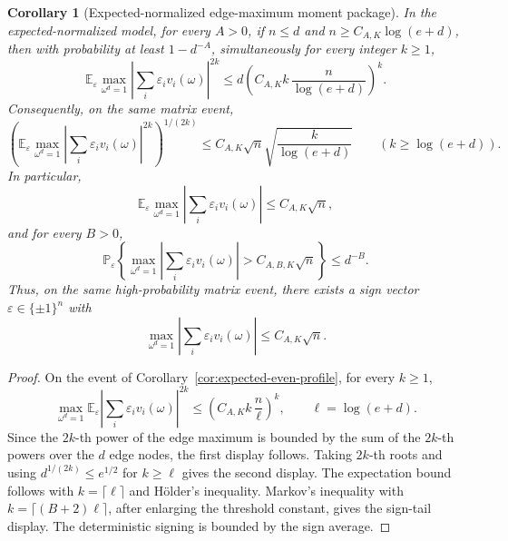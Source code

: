 \documentclass[11pt]{amsart}
\numberwithin{equation}{section}
\newtheorem{corollary}[theorem]{Corollary}
\theoremstyle{definition}
\theoremstyle{remark}
\newcommand{\Prob}{\mathbb P}
\newcommand{\Exp}{\mathbb E}
\newcommand{\eps}{\varepsilon}
\begin{document}
\begin{corollary}[Expected-normalized edge-maximum moment package]
\label{cor:expected-edge-max-moment-package}
In the expected-normalized model, for every \(A>0\), if \(n\le d\) and
\(n\ge C_{A,K}\log(e+d)\), then with probability at least \(1-d^{-A}\),
simultaneously for every integer \(k\ge1\),
\[
  \Exp_\eps
  \max_{\omega^d=1}
  \left|\sum_i\eps_i v_i(\omega)\right|^{2k}
  \le
  d\left(C_{A,K}k\,\frac{n}{\log(e+d)}\right)^k .
\]
Consequently, on the same matrix event,
\[
  \left(
  \Exp_\eps
  \max_{\omega^d=1}
  \left|\sum_i\eps_i v_i(\omega)\right|^{2k}
  \right)^{1/(2k)}
  \le
  C_{A,K}\sqrt n\sqrt{\frac{k}{\log(e+d)}}
  \qquad(k\ge\log(e+d)).
\]
In particular,
\[
  \Exp_\eps
  \max_{\omega^d=1}
  \left|\sum_i\eps_i v_i(\omega)\right|
  \le C_{A,K}\sqrt n,
\]
and for every \(B>0\),
\[
  \Prob_\eps\left\{
  \max_{\omega^d=1}
  \left|\sum_i\eps_i v_i(\omega)\right|
  > C_{A,B,K}\sqrt n
  \right\}
  \le d^{-B}.
\]
Thus, on the same high-probability matrix event, there exists a sign vector
\(\eps\in\{\pm1\}^n\) with
\[
  \max_{\omega^d=1}
  \left|\sum_i\eps_i v_i(\omega)\right|
  \le C_{A,K}\sqrt n .
\]
\end{corollary}

\begin{proof}
On the event of Corollary~\ref{cor:expected-even-profile}, for every \(k\ge1\),
\[
  \max_{\omega^d=1}
  \Exp_\eps\left|\sum_i\eps_i v_i(\omega)\right|^{2k}
  \le
  \left(C_{A,K}k\,\frac n{\ell}\right)^k,
  \qquad \ell=\log(e+d).
\]
Since the \(2k\)-th power of the edge maximum is bounded by the sum of the
\(2k\)-th powers over the \(d\) edge nodes, the first display follows.  Taking
\(2k\)-th roots and using \(d^{1/(2k)}\le e^{1/2}\) for \(k\ge\ell\) gives the
second display.  The expectation bound follows with \(k=\lceil\ell\rceil\) and
Hölder's inequality.  Markov's inequality with
\(k=\lceil(B+2)\ell\rceil\), after enlarging the threshold constant, gives the
sign-tail display.  The deterministic signing is bounded by the sign average.
\end{proof}
\end{document}
